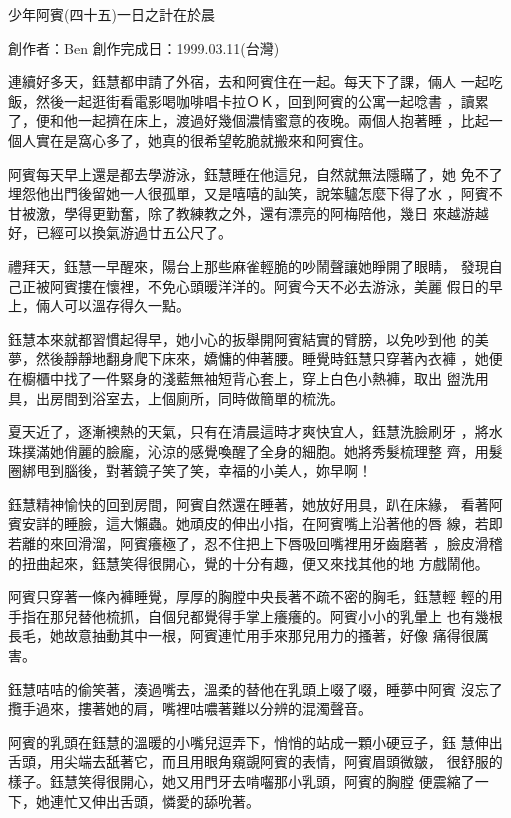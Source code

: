



少年阿賓(四十五)一日之計在於晨

創作者：Ben
創作完成日：1999.03.11(台灣)


連續好多天，鈺慧都申請了外宿，去和阿賓住在一起。每天下了課，倆人
一起吃飯，然後一起逛街看電影喝咖啡唱卡拉ＯＫ，回到阿賓的公寓一起唸書
，讀累了，便和他一起擠在床上，渡過好幾個濃情蜜意的夜晚。兩個人抱著睡
，比起一個人實在是窩心多了，她真的很希望乾脆就搬來和阿賓住。

阿賓每天早上還是都去學游泳，鈺慧睡在他這兒，自然就無法隱瞞了，她
免不了埋怨他出門後留她一人很孤單，又是嘻嘻的訕笑，說笨驢怎麼下得了水
，阿賓不甘被激，學得更勤奮，除了教練教之外，還有漂亮的阿梅陪他，幾日
來越游越好，已經可以換氣游過廿五公尺了。

禮拜天，鈺慧一早醒來，陽台上那些麻雀輕脆的吵鬧聲讓她睜開了眼睛，
發現自己正被阿賓摟在懷裡，不免心頭暖洋洋的。阿賓今天不必去游泳，美麗
假日的早上，倆人可以溫存得久一點。

鈺慧本來就都習慣起得早，她小心的扳舉開阿賓結實的臂膀，以免吵到他
的美夢，然後靜靜地翻身爬下床來，嬌慵的伸著腰。睡覺時鈺慧只穿著內衣褲
，她便在櫥櫃中找了一件緊身的淺藍無袖短背心套上，穿上白色小熱褲，取出
盥洗用具，出房間到浴室去，上個廁所，同時做簡單的梳洗。

夏天近了，逐漸襖熱的天氣，只有在清晨這時才爽快宜人，鈺慧洗臉刷牙
，將水珠撲滿她俏麗的臉龐，沁涼的感覺喚醒了全身的細胞。她將秀髮梳理整
齊，用髮圈綁甩到腦後，對著鏡子笑了笑，幸福的小美人，妳早啊！

鈺慧精神愉快的回到房間，阿賓自然還在睡著，她放好用具，趴在床緣，
看著阿賓安詳的睡臉，這大懶蟲。她頑皮的伸出小指，在阿賓嘴上沿著他的唇
線，若即若離的來回滑溜，阿賓癢極了，忍不住把上下唇吸回嘴裡用牙齒磨著
，臉皮滑稽的扭曲起來，鈺慧笑得很開心，覺的十分有趣，便又來找其他的地
方戲鬧他。

阿賓只穿著一條內褲睡覺，厚厚的胸膛中央長著不疏不密的胸毛，鈺慧輕
輕的用手指在那兒替他梳抓，自個兒都覺得手掌上癢癢的。阿賓小小的乳暈上
也有幾根長毛，她故意抽動其中一根，阿賓連忙用手來那兒用力的搔著，好像
痛得很厲害。

鈺慧咭咭的偷笑著，湊過嘴去，溫柔的替他在乳頭上啜了啜，睡夢中阿賓
沒忘了攬手過來，摟著她的肩，嘴裡咕噥著難以分辨的混濁聲音。

阿賓的乳頭在鈺慧的溫暖的小嘴兒逗弄下，悄悄的站成一顆小硬豆子，鈺
慧伸出舌頭，用尖端去舐著它，而且用眼角窺覬阿賓的表情，阿賓眉頭微皺，
很舒服的樣子。鈺慧笑得很開心，她又用門牙去啃囓那小乳頭，阿賓的胸膛
便震縮了一下，她連忙又伸出舌頭，憐愛的舔吮著。

